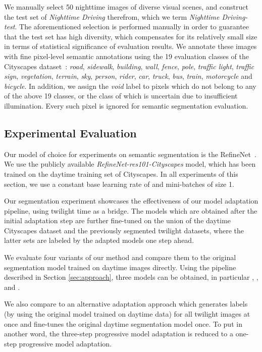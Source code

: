 \documentclass[letterpaper, 10 pt, conference]{ieeeconf}
\begin{document}
We manually select 50 nighttime images of diverse visual scenes, and construct the test set of \emph{Nighttime Driving} therefrom, which we term \emph{Nighttime Driving-test}. 
The aforementioned selection is performed manually in order to guarantee that the test set has high diversity, which compensates for its relatively small size in terms of statistical significance of evaluation results. 
We annotate these images with fine pixel-level semantic annotations using the 19 evaluation classes of the Cityscapes dataset~\cite{Cityscapes}: \emph{road}, \emph{sidewalk}, \emph{building}, \emph{wall}, \emph{fence}, \emph{pole}, \emph{traffic light}, \emph{traffic sign}, \emph{vegetation}, \emph{terrain}, \emph{sky}, \emph{person}, \emph{rider}, \emph{car}, \emph{truck}, \emph{bus}, \emph{train}, \emph{motorcycle} and \emph{bicycle}. 
In addition, we assign the \emph{void} label to pixels which do not belong to any of the above 19 classes, or the class of which is uncertain due to insufficient illumination. Every such pixel is ignored for semantic segmentation evaluation. 


\subsection{Experimental Evaluation}
Our model of choice for experiments on semantic segmentation is the RefineNet~\cite{refinenet}. We use the publicly available \emph{RefineNet-res101-Cityscapes} model, which has been trained on the daytime training set of Cityscapes. In all experiments of this section, we use a constant base learning rate of  and mini-batches of size 1.  

Our segmentation experiment showcases the effectiveness of our model adaptation pipeline, using twilight time as a bridge. The models which are obtained after the initial adaptation step are further fine-tuned on the union of the daytime Cityscapes dataset and the previously segmented twilight datasets, where the latter sets are labeled by the adapted models one step ahead. 

We evaluate four variants of our method and compare them to the original segmentation model trained on daytime images directly. Using the pipeline described in Section \ref{sec:approach}, three models can be obtained, in particular , , and . 

We also compare to an alternative adaptation approach which generates labels (by using the original model trained on daytime data) for all twilight images at once and fine-tunes the original daytime segmentation model once. To put in another word, the three-step progressive model adaptation is reduced to a one-step progressive model adaptation.  
\end{document}
